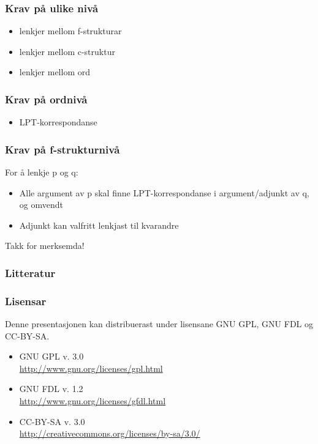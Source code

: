\documentclass{beamer}
\begin{document}
\begin{frame}\frametitle{Krav på ulike nivå}
  \begin{itemize}
  \item lenkjer mellom f-strukturar
  \item lenkjer mellom c-struktur
  \item lenkjer mellom ord %
  \end{itemize}
\end{frame}

\begin{frame}\frametitle{Krav på ordnivå}
  \begin{itemize}
  \item LPT-korrespondanse
  \end{itemize}
\end{frame}

\begin{frame}\frametitle{Krav på f-strukturnivå}
  For å lenkje p og q:
  \begin{itemize}
  \item Alle argument av p skal finne LPT-korrespondanse i argument/adjunkt av q, og omvendt
  \item Adjunkt kan valfritt lenkjast til kvarandre
  \end{itemize}
\end{frame}




\begin{frame}
  \begin{center}
    {\huge Takk for merksemda!}
  \end{center}
\end{frame}

\begin{frame}\frametitle{Litteratur}
  \nocite{dyvik2009lmp}
  
  
\end{frame}

\begin{frame}\frametitle{Lisensar}
  Denne presentasjonen kan distribuerast under lisensane
  GNU GPL, GNU FDL og CC-BY-SA.
  \begin{itemize}
  \item GNU GPL v. 3.0 \\
    \href{http://www.gnu.org/licenses/gpl.html}{http://www.gnu.org/licenses/gpl.html}
  \item GNU FDL v. 1.2 \\
    \href{http://www.gnu.org/licenses/gfdl.html}{http://www.gnu.org/licenses/gfdl.html}
  \item CC-BY-SA v. 3.0 \\
    \href{http://creativecommons.org/licenses/by-sa/3.0/}{http://creativecommons.org/licenses/by-sa/3.0/}
  \end{itemize}
\end{frame}
\end{document}
